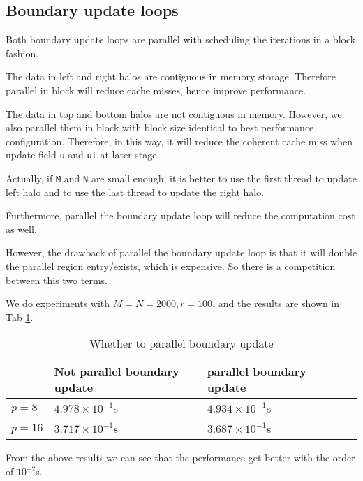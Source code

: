 \subsection{Boundary update loops}

Both boundary update loops are parallel with scheduling the iterations in a block fashion.

The data in left and right halos are contiguous in memory storage. 
Therefore parallel in block will reduce cache misses, hence improve performance.

The data in top and bottom halos are not contiguous in memory. 
However, we also parallel them in block with block size identical to best performance configuration. 
Therefore, in this way, it will reduce the coherent cache miss when update field \lstinline{u} and \lstinline{ut} at later stage.

Actually, if \lstinline{M} and \lstinline{N} are small enough, it is better to use the first thread to update left halo and to use the last thread to update the right halo.

Furthermore, parallel the boundary update loop will reduce the computation cost as well.

However, the drawback of parallel the boundary update loop is that it will double the parallel region entry/exists,
which is expensive. So there is a competition between this two terms.

We do experiments with $M=N=2000, r=100$, and the results are shown in Tab \ref{tab2}.

\begin{table}[h]
	\centering
	\caption{Whether to parallel boundary update}
	\label{tab2}
	\begin{tabular}{lllll}
		\hline
		             & Not parallel boundary update & parallel boundary update\\ \hline
		$p=8$            & $4.978\times 10^{-1}$s & $4.934\times 10^{-1}$s  \\
		$p=16$           & $3.717\times 10^{-1}$s & $3.687\times 10^{-1}$s   \\ \hline
	\end{tabular}
\end{table}

From the above results,we can see that the performance get better with the order of $10^{-2}$s.
